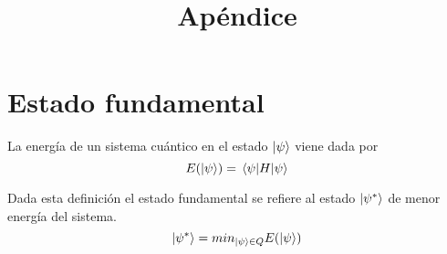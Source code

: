 \documentclass{article}
\title{Apéndice}
\begin{document}
\maketitle{}

\section{Estado fundamental}
\label{sec:6-apendice-estado_fundamental}
La energía de un sistema cuántico en el estado \( \ket{\psi} \) viene dada por \[ E(\ket{\psi}) = \expval{H}{\psi} \]

Dada esta definición el estado fundamental se refiere al estado \(\ket{\psi^*}\) de menor energía del sistema.
  \[ \ket{\psi^*} = min_{\ket{\psi} \in Q} E(\ket{\psi}) \]
\end{document}
